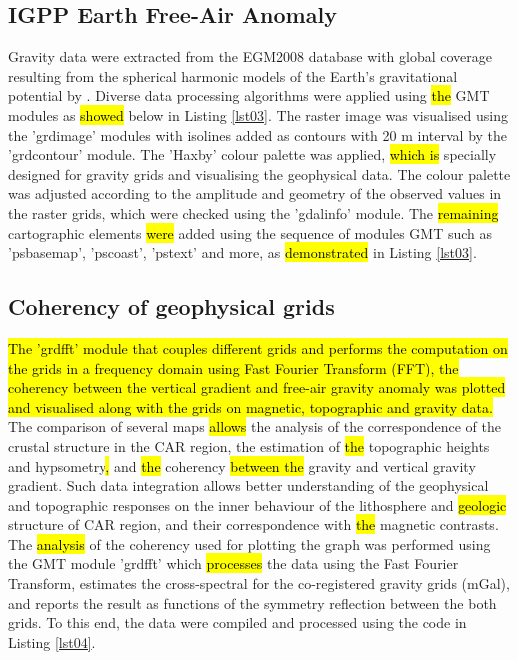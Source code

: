 \documentclass[minerals,article,submit,pdftex,moreauthors]{Definitions/mdpi}
\begin{document}
\subsection{IGPP Earth Free-Air Anomaly}
Gravity data were extracted from the EGM2008 database with global coverage resulting from the spherical harmonic models of the Earth's gravitational potential by \cite{Pavlis}. Diverse data processing algorithms were applied using \hl{the }GMT modules as \hl{showed} below in Listing \ref{lst03}. The raster image was visualised using the 'grdimage' modules with isolines added as contours with 20 m interval by the 'grdcontour' module. The 'Haxby' colour palette was applied, \hl{which is }specially designed for gravity grids and visualising the geophysical data. The colour palette was adjusted according to the amplitude and geometry of the observed values in the raster grids, which were checked using the 'gdalinfo' module. The \hl{remaining} cartographic elements \hl{were} added using the sequence of modules GMT such as 'psbasemap', 'pscoast', 'pstext' and more, as \hl{demonstrated} in Listing \ref{lst03}.

\subsection{Coherency of geophysical grids}

\hl{The 'grdfft' module that couples different grids and performs the computation on the grids in a frequency domain using Fast Fourier Transform (FFT), the coherency between the vertical gradient and free-air gravity anomaly was plotted and visualised along with the grids on magnetic, topographic and gravity data. }The comparison of several maps \hl{allows} the analysis of the correspondence of the crustal structure in the CAR region, the estimation of \hl{the }topographic heights and hypsometry\hl{, }and \hl{the }coherency \hl{between the} gravity and vertical gravity gradient. Such data integration allows better understanding of the geophysical and topographic responses on the inner behaviour of the lithosphere and \hl{geologic} structure of CAR region, and their correspondence with \hl{the }magnetic contrasts. The \hl{analysis} of the coherency used for plotting the graph was performed using the GMT module 'grdfft' which \hl{processes} the data using the Fast Fourier Transform, estimates the cross-spectral for the co-registered gravity grids (mGal), and reports the result as functions of the symmetry reflection between the both grids. To this end, the data were compiled and processed using the code in Listing \ref{lst04}. 
\end{document}
